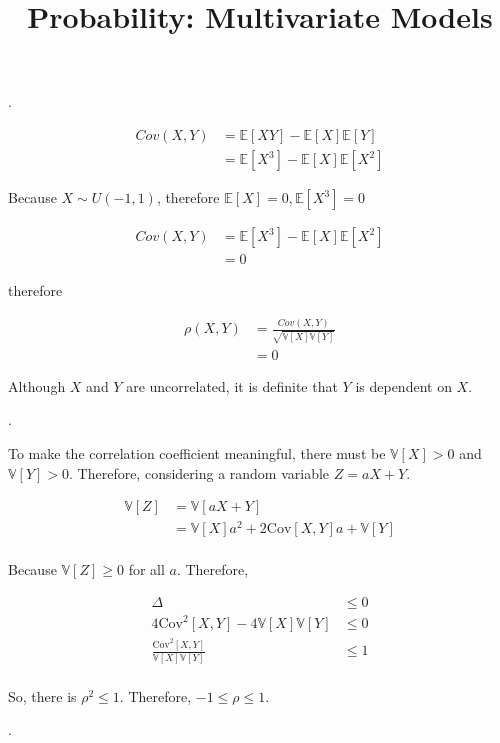 \documentclass[UTF8]{article}
\title{Probability: Multivariate Models}
\date{}
\begin{document}
\maketitle

.

\begin{align*}
    Cov(X, Y) &= \mathbb{E}[XY] - \mathbb{E}[X]\mathbb{E}[Y]\\
    &=\mathbb{E}[X^3] - \mathbb{E}[X]\mathbb{E}[X^2]
\end{align*}

Because $X\sim U(-1, 1)$, therefore $\mathbb{E}[X] = 0, \mathbb{E}[X^3] = 0$

\begin{align*}
    Cov(X, Y) &=\mathbb{E}[X^3] - \mathbb{E}[X]\mathbb{E}[X^2]\\
    &=0
\end{align*}

therefore

\begin{align*}
    \rho(X, Y) &=\frac{Cov(X, Y)}{\sqrt{\mathbb{V}[X]\mathbb{V}[Y]}}\\
    &=0
\end{align*}

Although $X$ and $Y$ are uncorrelated, it is definite that $Y$ is dependent on $X$.

.

To make the correlation coefficient meaningful, there must be $\mathbb{V}[X]>0$ and $\mathbb{V}[Y]>0$. Therefore, considering a random variable $Z = aX + Y$.

\begin{align*}
	\mathbb{V}[Z] &= \mathbb{V}[aX+Y]\\
	&=\mathbb{V}[X]a^2+2\text{Cov}[X, Y]a+\mathbb{V}[Y]\\
\end{align*}

Because $\mathbb{V}[Z]\ge 0$ for all $a$. Therefore, 

\begin{align*}
	\Delta &\le 0\\
	4\text{Cov}^2[X, Y] - 4\mathbb{V}[X]\mathbb{V}[Y]&\le 0\\
	\frac{\text{Cov}^2[X, Y]}{\mathbb{V}[X]\mathbb{V}[Y]}&\le 1\\
\end{align*}

So, there is $\rho^2\le 1$. Therefore, $-1\le\rho\le 1$.

.
\end{document}
